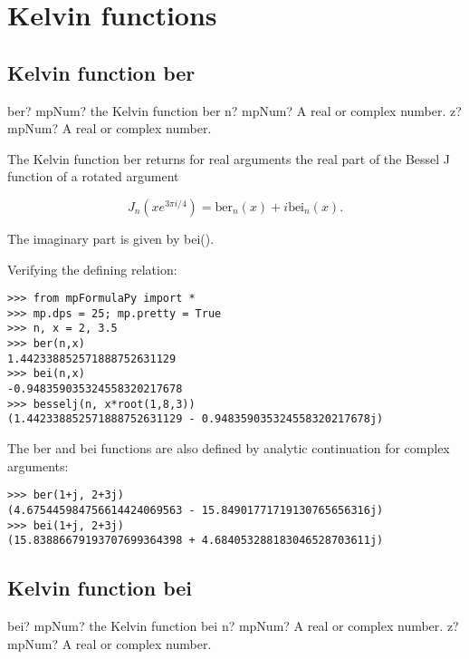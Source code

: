 \newpage
\section{Kelvin functions}

\subsection{Kelvin function ber}

\begin{mpFunctionsExtract}
	\mpFunctionTwo
	{ber? mpNum? the Kelvin function ber}
	{n? mpNum? A real or complex number.}
	{z? mpNum? A real or complex number.}	
\end{mpFunctionsExtract}

\vpara
The Kelvin function ber returns for real arguments the real part of the Bessel J function of a rotated argument

\begin{equation}
J_n(x e^{3\pi i/4}) = \text{ber}_n(x) + i \text{bei}_n(x).
\end{equation}

The imaginary part is given by bei().

Verifying the defining relation:

\begin{lstlisting}
>>> from mpFormulaPy import *
>>> mp.dps = 25; mp.pretty = True
>>> n, x = 2, 3.5
>>> ber(n,x)
1.442338852571888752631129
>>> bei(n,x)
-0.948359035324558320217678
>>> besselj(n, x*root(1,8,3))
(1.442338852571888752631129 - 0.948359035324558320217678j)
\end{lstlisting}


The ber and bei functions are also defined by analytic continuation for complex arguments:

\begin{lstlisting}
>>> ber(1+j, 2+3j)
(4.675445984756614424069563 - 15.84901771719130765656316j)
>>> bei(1+j, 2+3j)
(15.83886679193707699364398 + 4.684053288183046528703611j)
\end{lstlisting}



\subsection{Kelvin function bei}

\begin{mpFunctionsExtract}
	\mpFunctionTwo
	{bei? mpNum? the Kelvin function bei}
	{n? mpNum? A real or complex number.}
	{z? mpNum? A real or complex number.}	
\end{mpFunctionsExtract}


